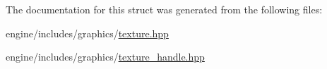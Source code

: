 The documentation for this struct was generated from the following files\+:\begin{DoxyCompactItemize}
\item 
engine/includes/graphics/\mbox{\hyperlink{texture_8hpp}{texture.\+hpp}}\item 
engine/includes/graphics/\mbox{\hyperlink{texture__handle_8hpp}{texture\+\_\+handle.\+hpp}}\end{DoxyCompactItemize}
